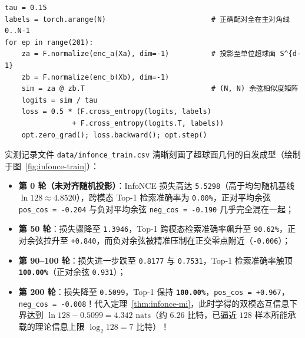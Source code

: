 \begin{lstlisting}[caption={纯 PyTorch 对称 CLIP 风格 InfoNCE 核心训练步（与 \texttt{vol5\_experiments.py} 一致）},label={lst:infonce}]
tau = 0.15
labels = torch.arange(N)                         # 正确配对全在主对角线 0..N-1
for ep in range(201):
    za = F.normalize(enc_a(Xa), dim=-1)          # 投影至单位超球面 S^{d-1}
    zb = F.normalize(enc_b(Xb), dim=-1)
    sim = za @ zb.T                              # (N, N) 余弦相似度矩阵
    logits = sim / tau
    loss = 0.5 * (F.cross_entropy(logits, labels)
                + F.cross_entropy(logits.T, labels))
    opt.zero_grad(); loss.backward(); opt.step()
\end{lstlisting}

实测记录文件 \texttt{data/infonce\_train.csv} 清晰刻画了超球面几何的自发成型（绘制于图~\ref{fig:infonce-train}）：
\begin{itemize}
  \item \textbf{第 0 轮（未对齐随机投影）}：InfoNCE 损失高达 \texttt{5.5298}（高于均匀随机基线 $\ln 128 \approx 4.8520$），跨模态 Top-1 检索准确率为 \texttt{0.00\%}，正对平均余弦 \texttt{pos\_cos = -0.204} 与负对平均余弦 \texttt{neg\_cos = -0.190} 几乎完全混在一起；
  \item \textbf{第 50 轮}：损失骤降至 \texttt{1.3946}，Top-1 跨模态检索准确率飙升至 \texttt{90.62\%}，正对余弦拉升至 \texttt{+0.840}，而负对余弦被精准压制在正交零点附近（\texttt{-0.006}）；
  \item \textbf{第 90--100 轮}：损失进一步跌至 \texttt{0.8177} 与 \texttt{0.7531}，Top-1 检索准确率触顶 \textbf{\texttt{100.00\%}}（正对余弦 \texttt{0.931}）；
  \item \textbf{第 200 轮}：损失降至 \texttt{0.5099}，Top-1 保持 \textbf{\texttt{100.00\%}}，\texttt{pos\_cos = +0.967}，\texttt{neg\_cos = -0.008}！代入定理~\ref{thm:infonce-mi}，此时学得的双模态互信息下界达到 $\ln 128 - 0.5099 = 4.342\text{ nats}$（约 $6.26$ 比特，已逼近 $128$ 样本所能承载的理论信息上限 $\log_2 128 = 7$ 比特）！
\end{itemize}

